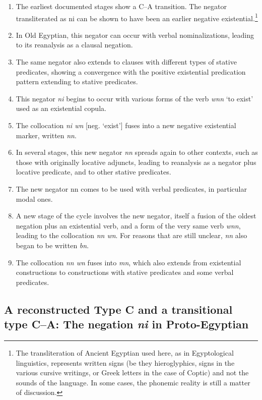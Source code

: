 \documentclass[output=paper]{langsci/langscibook}
\newcommand{\ꜥ}{ʿ}
\newcommand{\ꜣ}{\kern-.25pt\texttt{ꜣ}\kern-.6pt}
\begin{document}
\begin{enumerate}
	\item The earliest documented stages show a C--A transition. The negator transliterated as ni can be shown to have been an earlier negative existential.\footnote{The transliteration of Ancient Egyptian used here, as in Egyptological linguistics, represents written signs (be they hieroglyphics, signs in the various cursive writings, or Greek letters in the case of Coptic) and not the sounds of the language. In some cases, the phonemic reality is still a matter of discussion. }
	\item In Old Egyptian, this negator can occur with verbal nominalizations, leading to its reanalysis as a clausal negation.
	\item The same negator also extends to clauses with different types of stative predicates, showing a convergence with the positive existential predication pattern extending to stative predicates.
	\item This negator \textit{ni} begins to occur with various forms of the verb \textit{wnn} ‘to exist’ used as an existential copula.
	\item The collocation \textit{ni wn} [neg. ‘exist’] fuses into a new negative existential marker, written \textit{nn}.
	\item In several stages, this new negator \textit{nn} spreads again to other contexts, such as those with originally locative adjuncts, leading to reanalysis as a negator plus locative predicate, and to other stative predicates.
	\item The new negator nn comes to be used with verbal predicates, in particular modal ones.
	\item A new stage of the cycle involves the new negator, itself a fusion of the oldest negation plus an existential verb, and a form of the very same verb \textit{wnn}, leading to the collocation \textit{nn wn}. For reasons that are still unclear, \textit{nn} also began to be written \textit{bn}.
	\item The collocation \textit{nn wn} fuses into \textit{mn}, which also extends from existential constructions to constructions with stative predicates and some verbal predicates.
\end{enumerate}


\subsection{A reconstructed Type C and a transitional type C--A: The negation \textit{ni} in Proto-Egyptian}\label{s:AE2-1}
\end{document}
